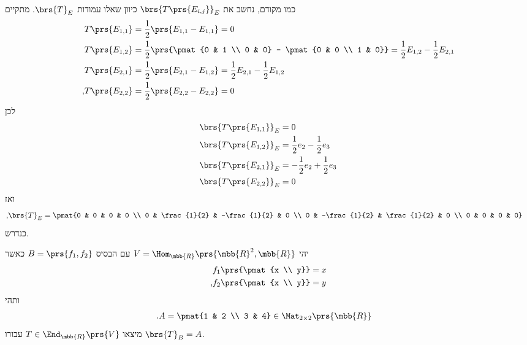 \documentclass[a4paper,10pt,twoside,openany]{book}
\begin{document}
\begin{solution}
כמו מקודם, נחשב את
$\brs{T\prs{E_{i,j}}}_E$
כיוון שאלו עמודות
$\brs{T}_E$.
מתקיים
\begin{align*}
T\prs{E_{1,1}} &= \frac{1}{2} \prs{E_{1,1} - E_{1,1}} = 0 \\
T\prs{E_{1,2}} &= \frac{1}{2} \prs{\pmat{0 & 1 \\ 0 & 0} - \pmat{0 & 0 \\ 1 & 0}} = \frac{1}{2} E_{1,2} - \frac{1}{2} E_{2,1} \\
T\prs{E_{2,1}} &= \frac{1}{2} \prs{E_{2,1} - E_{1,2}} = \frac{1}{2} E_{2,1} - \frac{1}{2} E_{1,2} \\
\text{,} T\prs{E_{2,2}} &= \frac{1}{2} \prs{E_{2,2} - E_{2,2}} = 0 \\
\end{align*}
לכן
\begin{align*}
\brs{T\prs{E_{1,1}}}_E &= 0 \\
\brs{T\prs{E_{1,2}}}_E &= \frac{1}{2} e_2 - \frac{1}{2} e_3 \\
\brs{T\prs{E_{2,1}}}_E &= -\frac{1}{2} e_2 + \frac{1}{2} e_3 \\
\brs{T\prs{E_{2,2}}}_E &= 0
\end{align*}
ואז
\begin{align*}
\text{,} \brs{T}_E &= \pmat{0 & 0 & 0 & 0 \\ 0 & \frac{1}{2} & -\frac{1}{2} & 0 \\ 0 & -\frac{1}{2} & \frac{1}{2} & 0 \\ 0 & 0 & 0 & 0}
\end{align*}
כנדרש.
\end{solution}

\begin{exercisechap}
יהי
$V = \Hom_{\mbb{R}}\prs{\mbb{R}^2, \mbb{R}}$
עם הבסיס
$B = \prs{f_1, f_2}$
כאשר
\begin{align*}
f_1\prs{\pmat{x \\ y}} &= x \\
\text{,} f_2\prs{\pmat{x \\ y}} &= y
\end{align*}
ותהי
\begin{align*}
\text{.} A &= \pmat{1 & 2 \\ 3 & 4} \in \Mat_{2 \times 2}\prs{\mbb{R}}
\end{align*}
מיצאו
$T \in \End_{\mbb{R}}\prs{V}$
עבורו
$\brs{T}_B = A$.
\end{exercisechap}
\end{document}
